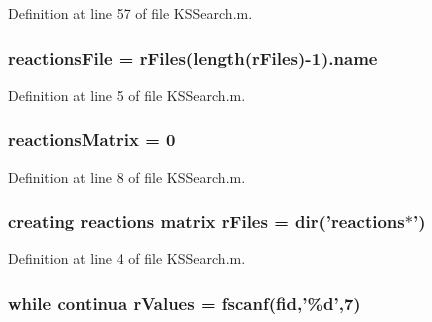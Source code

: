 Definition at line 57 of file K\-S\-Search.\-m.

\hypertarget{a00024_a4c72dba1fe2ee2fbcc699262a8d0c624}{
\subsubsection[{reactions\-File}]{\setlength{\rightskip}{0pt plus 5cm}reactions\-File = {\bf r\-Files}(length({\bf r\-Files})-\/1).{\bf name}}}\label{a00024_a4c72dba1fe2ee2fbcc699262a8d0c624}


Definition at line 5 of file K\-S\-Search.\-m.

\hypertarget{a00024_ac52097a2745fcef31eb175d2e9485845}{
\subsubsection[{reactions\-Matrix}]{\setlength{\rightskip}{0pt plus 5cm}reactions\-Matrix = 0}}\label{a00024_ac52097a2745fcef31eb175d2e9485845}


Definition at line 8 of file K\-S\-Search.\-m.

\hypertarget{a00024_ad75735665492cabd747370126464fddf}{
\subsubsection[{r\-Files}]{\setlength{\rightskip}{0pt plus 5cm}creating {\bf reactions} matrix r\-Files = {\bf dir}('{\bf reactions}$\ast$')}}\label{a00024_ad75735665492cabd747370126464fddf}


Definition at line 4 of file K\-S\-Search.\-m.

\hypertarget{a00024_a436a6968124e560649654a4abbd9dac6}{
\subsubsection[{r\-Values}]{\setlength{\rightskip}{0pt plus 5cm}while {\bf continua} r\-Values = {\bf fscanf}({\bf fid},'\%d',7)}}\label{a00024_a436a6968124e560649654a4abbd9dac6}


